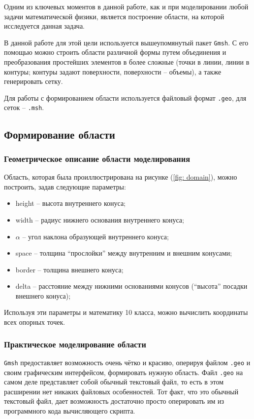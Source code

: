 \documentclass[a4paper, 14pt]{extreport}
\begin{document}
Одним из ключевых моментов в данной работе, как и при моделировании 
любой задачи математической физики, является построение области, 
на которой исследуется данная задача.

В данной работе для этой цели используется вышеупомянутый пакет
 \texttt{Gmsh}. С его помощью можно строить области различной формы
 путем объединения и преобразования простейших элементов в более 
 сложные (точки в линии, линии в контуры; контуры задают поверхности,
  поверхности -- объемы), а также генерировать сетку.

Для работы с формированием области используется файловый формат 
\texttt{.geo}, для сеток -- \texttt{.msh}.

\subsection{Формирование области}
\subsubsection{Геометрическое описание области моделирования}

Область, которая была проиллюстрирована на рисунке (\ref{fig: domain}),
можно построить, задав следующие параметры:
\begin{itemize}
	\item height -- высота внутреннего конуса;
	\item width -- радиус нижнего основания внутреннего конуса;
	\item $\alpha$ -- угол наклона образующей внутреннего конуса;
	\item space -- толщина \enquote{прослойки} между внутренним и внешним 
	конусами;
	\item border -- толщина внешнего конуса;
	\item delta -- расстояние между нижними основаниями конусов 
	(\enquote{высота} посадки внешнего конуса);
\end{itemize}

Используя эти параметры и математику 10 класса,
можно вычислить координаты всех опорных точек.

\subsubsection{Практическое моделирование области}

\texttt{Gmsh} предоставляет возможность очень чётко и красиво,
 оперируя файлом \texttt{.geo} и своим графическим интерфейсом,  
формировать нужную область.
Файл \texttt{.geo} на самом деле представляет собой обычный текстовый файл, то есть в этом расширении нет никаких файловых особенностей.
Тот факт, что это обычный текстовый файл, дает возможность достаточно просто оперировать им из программного кода вычисляющего скрипта.
\end{document}
